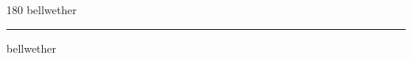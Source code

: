
\begin{frame}
\begin{center}
\begin{turn}{180}
{\fontsize{2.5cm}{1em}\selectfont bellwether}
\end{turn}
\vspace{1em}\par  
\hrule
\vspace{1em}\par  
{\fontsize{2.5cm}{1em}\selectfont bellwether}
\end{center}
\end{frame}

